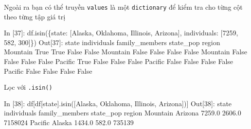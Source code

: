 \documentclass[
]{book}
\newenvironment{Shaded}{\begin{snugshade}}{\end{snugshade}}
\newcommand{\DecValTok}[1]{\textcolor[rgb]{0.00,0.00,0.81}{#1}}
\newcommand{\FloatTok}[1]{\textcolor[rgb]{0.00,0.00,0.81}{#1}}
\newcommand{\NormalTok}[1]{#1}
\newcommand{\StringTok}[1]{\textcolor[rgb]{0.31,0.60,0.02}{#1}}
\newcommand{\VariableTok}[1]{\textcolor[rgb]{0.00,0.00,0.00}{#1}}
\begin{document}
Ngoài ra bạn có thể truyền \texttt{values} là một \texttt{dictionary} để kiểm tra cho từng cột theo từng tập giá trị

\begin{Shaded}
\begin{Highlighting}[]
\NormalTok{In [}\DecValTok{37}\NormalTok{]: df.isin(\{}\StringTok{\textquotesingle{}state\textquotesingle{}}\NormalTok{: [}\StringTok{\textquotesingle{}Alaska\textquotesingle{}}\NormalTok{, }\StringTok{\textquotesingle{}Oklahoma\textquotesingle{}}\NormalTok{, }\StringTok{\textquotesingle{}Illinois\textquotesingle{}}\NormalTok{, }\StringTok{\textquotesingle{}Arizona\textquotesingle{}}\NormalTok{], }
         \StringTok{\textquotesingle{}individuals\textquotesingle{}}\NormalTok{: [}\DecValTok{7259}\NormalTok{, }\DecValTok{582}\NormalTok{, }\DecValTok{300}\NormalTok{]\})}
\NormalTok{Out[}\DecValTok{37}\NormalTok{]:}
\NormalTok{          state  individuals  family\_members  state\_pop}
\NormalTok{region                                                 }
\NormalTok{Mountain   }\VariableTok{True}         \VariableTok{True}           \VariableTok{False}      \VariableTok{False}
\NormalTok{Mountain  }\VariableTok{False}        \VariableTok{False}           \VariableTok{False}      \VariableTok{False}
\NormalTok{Mountain  }\VariableTok{False}        \VariableTok{False}           \VariableTok{False}      \VariableTok{False}
\NormalTok{Pacific    }\VariableTok{True}        \VariableTok{False}           \VariableTok{False}      \VariableTok{False}
\NormalTok{Pacific   }\VariableTok{False}        \VariableTok{False}           \VariableTok{False}      \VariableTok{False}
\NormalTok{Pacific   }\VariableTok{False}        \VariableTok{False}           \VariableTok{False}      \VariableTok{False}
\end{Highlighting}
\end{Shaded}

Lọc với \texttt{.isin()}

\begin{Shaded}
\begin{Highlighting}[]
\NormalTok{In [}\DecValTok{38}\NormalTok{]: df[df[}\StringTok{\textquotesingle{}state\textquotesingle{}}\NormalTok{].isin([}\StringTok{\textquotesingle{}Alaska\textquotesingle{}}\NormalTok{, }\StringTok{\textquotesingle{}Oklahoma\textquotesingle{}}\NormalTok{, }\StringTok{\textquotesingle{}Illinois\textquotesingle{}}\NormalTok{, }\StringTok{\textquotesingle{}Arizona\textquotesingle{}}\NormalTok{])]}
\NormalTok{Out[}\DecValTok{38}\NormalTok{]:}
\NormalTok{            state  individuals  family\_members  state\_pop}
\NormalTok{region                                                   }
\NormalTok{Mountain  Arizona       }\FloatTok{7259.0}          \FloatTok{2606.0}    \DecValTok{7158024}
\NormalTok{Pacific    Alaska       }\FloatTok{1434.0}           \FloatTok{582.0}     \DecValTok{735139}
\end{Highlighting}
\end{Shaded}
\end{document}
